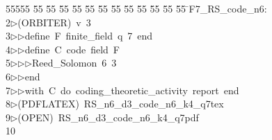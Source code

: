 %
%
\begin{tabbing}
55555 \= 55 \= 55 \= 55 \= 55 \= 55 \= 55 \= 55 \= 55 \= 55 \= 55 \= 55 \= 55 \= \>F7\_RS\_code\_n6:\\[0pt]
2\>$\triangleright$\>(ORBITER)\ v\ 3\ \\[0pt]
3\>$\triangleright$\>$\triangleright$\>define\ F\ finite\_field\ q\ 7\ end\ \\[0pt]
4\>$\triangleright$\>$\triangleright$\>define\ C\ code\ field\ F\ \\[0pt]
5\>$\triangleright$\>$\triangleright$\>$\triangleright$\>Reed\_Solomon\ 6\ 3\ \\[0pt]
6\>$\triangleright$\>$\triangleright$\>end\ \\[0pt]
7\>$\triangleright$\>$\triangleright$\>with\ C\ do\ coding\_theoretic\_activity\ report\ end\\[0pt]
8\>$\triangleright$\>(PDFLATEX)\ RS\_n6\_d3\_code\_n6\_k4\_q7tex\\[0pt]
9\>$\triangleright$\>(OPEN)\ RS\_n6\_d3\_code\_n6\_k4\_q7pdf\\[0pt]
10\>\end{tabbing}
